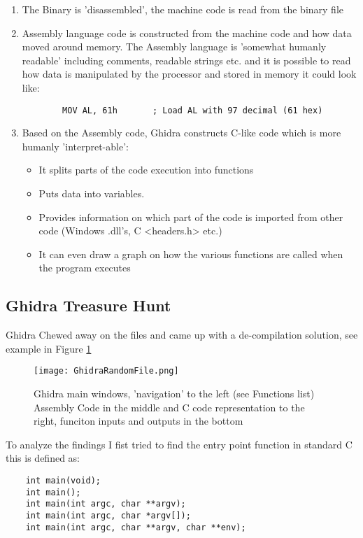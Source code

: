 \documentclass[
	letterpaper, %
	10pt, %
	unnumberedsections, %
	twoside, %
]{APAAssignment}
\begin{document}
\begin{enumerate}
	\item The Binary is 'disassembled', the machine code is read from the binary file
	\item Assembly language code is constructed from the machine code and how data moved around memory. The Assembly language is 'somewhat humanly readable' including comments, readable strings etc. and it is possible to read how data is manipulated by the processor and stored in memory it could look like:  
	\begin{verbatim}
		MOV AL, 61h       ; Load AL with 97 decimal (61 hex)
	\end{verbatim} 
	
	\item Based on the Assembly code, Ghidra constructs C-like code which is more humanly 'interpret-able': \begin{itemize}
		\item It splits parts of the code execution into functions
		\item Puts data into variables.
		\item Provides information on which part of the code is imported from other code (Windows .dll's, C <headers.h> etc.)    
		\item It can even draw a graph on how the various functions are called when the program executes
	\end{itemize}
\end{enumerate}

\subsection{Ghidra Treasure Hunt}
Ghidra Chewed away on the files and came up with a de-compilation solution, see example in Figure \ref{fig:Ghidra}

\begin{figure}[!htp] %
	\centering
	\texttt{[image: GhidraRandomFile.png]}
	\caption{Ghidra main windows, 'navigation' to the left (see Functions list) Assembly Code in the middle and C code representation to the right, funciton inputs and outputs in the bottom}
	\label{fig:Ghidra}
\end{figure}



To analyze the findings I fist tried to find the entry point function in standard C this is defined as:
\begin{verbatim}
	int main(void);
	int main();
	int main(int argc, char **argv);
	int main(int argc, char *argv[]);
	int main(int argc, char **argv, char **env);
\end{verbatim} 
\end{document}
